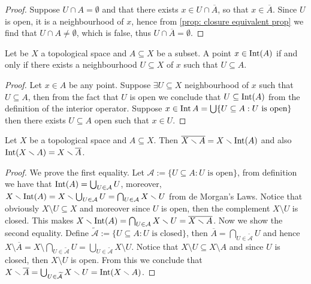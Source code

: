 \begin{proof}
Suppose \(U \cap A = \emptyset\) and that there exists \(x \in U \cap
\overline A\), so that \(x \in \overline A\). Since \(U\) is open, it
is a neighbourhood of \(x\), hence from \cref{prop: closure equivalent prop}
we find that \(U \cap A \neq \emptyset\), which is false, thus \(U \cap
\overline A = \emptyset\).
\end{proof}

\begin{proposition}\label{prop: open set nbhd criterion}
Let be \(X\) a topological space and \(A \subseteq X\) be a subset. A point
\(x \in \operatorname{Int}(A)\) if and only if there exists a neighbourhood \(U \subseteq
X\) of \(x\) such that \(U \subseteq A\).
\end{proposition}

\begin{proof}
Let \(x \in A\) be any point. Suppose \(\exists U \subseteq X\) neighbourhood
of \(x\) such that \(U \subseteq A\), then from the fact that \(U\) is open we
conclude that \(U \subseteq \operatorname{Int}(A)\) from the definition of the interior
operator. Suppose \(x \in \operatorname{Int} A = \bigcup \{U \subseteq A : U \text{ is
open}\}\) then there exists \(U \subseteq A\) open such that \(x \in U\).
\end{proof}

\begin{proposition}
Let \(X\) be a topological space and \(A \subseteq X\). Then \(\overline{X
\smallsetminus A} = X \smallsetminus \operatorname{Int}(A)\) and also \(\operatorname{Int}(X \smallsetminus A) =
X \smallsetminus \overline A\).
\end{proposition}

\begin{proof}
We prove the first equality. Let \(\mathcal A := \{U \subseteq A : U \text{ is
open}\}\), from definition we have that \(\operatorname{Int}(A) = \bigcup_{U \in \mathcal A} U\),
moreover, \(X \smallsetminus \operatorname{Int}(A) = X \smallsetminus \bigcup_{U \in \mathcal A} U = \bigcap_{U \in \mathcal A} X \smallsetminus U\)
from de Morgan's Laws. Notice that obviously \(X \setminus U \subseteq X\) and moreover since
\(U\) is open, then the complement \(X \setminus U\) is closed. This makes \(X \smallsetminus \operatorname{Int}(A)
= \bigcap_{U \in \mathcal A} X \smallsetminus U = \overline{X \smallsetminus A}\). Now we show the second
equality. Define \(\mathcal{\widetilde A} := \{U \subseteq A : U \text{ is closed}\}\),
then \(\overline A = \bigcap_{U \in \mathcal{\widetilde A}} U\) and hence \(X \setminus
\overline A = X \setminus \bigcap_{U \in \mathcal{\widetilde A}} U = \bigcup_{U \in \widetilde{\mathcal{A}}} X \setminus
U\). Notice that \(X\setminus U \subseteq X \setminus A\) and since \(U\) is closed, then \(X \setminus U\) is
open. From this we conclude that \(X \smallsetminus \overline A = \bigcup_{U \in \mathcal{\widetilde
A}} X \smallsetminus U = \operatorname{Int}(X \smallsetminus A)\).
\end{proof}

